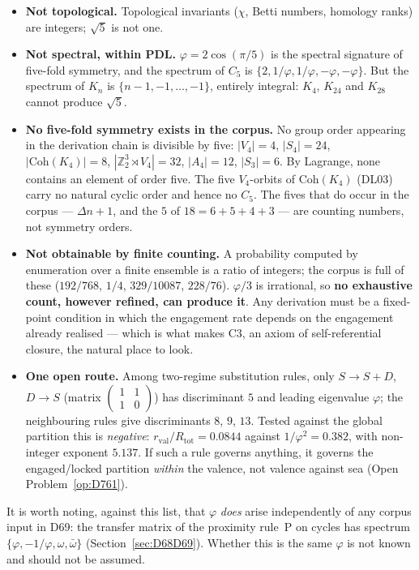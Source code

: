 \documentclass[11pt,a4paper]{article}
\theoremstyle{plain}
\theoremstyle{definition}
\theoremstyle{remark}
\newcommand{\Kfour}{K_4}
\newcommand{\rval}{r_{\mathrm{val}}}
\newcommand{\Rtot}{R_{\mathrm{tot}}}
\begin{document}
\begin{itemize}
\item \textbf{Not topological.} Topological invariants ($\chi$, Betti numbers, homology ranks) are integers; $\sqrt5$ is not one.
\item \textbf{Not spectral, within PDL.} $\varphi=2\cos(\pi/5)$ is the spectral signature of five-fold symmetry, and the spectrum of $C_5$ is $\{2,1/\varphi,1/\varphi,-\varphi,-\varphi\}$. But the spectrum of $K_n$ is $\{n-1,-1,\ldots,-1\}$, entirely integral: $\Kfour$, $K_{24}$ and $K_{28}$ cannot produce $\sqrt5$.
\item \textbf{No five-fold symmetry exists in the corpus.} No group order appearing in the derivation chain is divisible by five: $|V_4|=4$, $|S_4|=24$, $|\mathrm{Coh}(\Kfour)|=8$, $|\mathbb{Z}_2^3\rtimes V_4|=32$, $|A_4|=12$, $|S_3|=6$. By Lagrange, none contains an element of order five. The five $V_4$-orbits of $\mathrm{Coh}(\Kfour)$ (DL03) carry no natural cyclic order and hence no $C_5$. The fives that do occur in the corpus --- $\Delta n+1$, and the $5$ of $18=6+5+4+3$ --- are counting numbers, not symmetry orders.
\item \textbf{Not obtainable by finite counting.} A probability computed by enumeration over a finite ensemble is a ratio of integers; the corpus is full of these ($192/768$, $1/4$, $329/10087$, $228/76$). $\varphi/3$ is irrational, so \textbf{no exhaustive count, however refined, can produce it}. Any derivation must be a fixed-point condition in which the engagement rate depends on the engagement already realised --- which is what makes C3, an axiom of self-referential closure, the natural place to look.
\item \textbf{One open route.} Among two-regime substitution rules, only $S\to S{+}D$, $D\to S$ (matrix $\left(\begin{smallmatrix}1&1\\1&0\end{smallmatrix}\right)$) has discriminant $5$ and leading eigenvalue $\varphi$; the neighbouring rules give discriminants $8$, $9$, $13$. Tested against the global partition this is \emph{negative}: $\rval/\Rtot=0.0844$ against $1/\varphi^2=0.382$, with non-integer exponent $5.137$. If such a rule governs anything, it governs the engaged/locked partition \emph{within} the valence, not valence against sea (Open Problem~\ref{op:D761}).
\end{itemize}

\noindent It is worth noting, against this list, that $\varphi$ \emph{does} arise independently of any corpus input in D69: the transfer matrix of the proximity rule~P on cycles has spectrum $\{\varphi,-1/\varphi,\omega,\bar\omega\}$ (Section~\ref{sec:D68D69}). Whether this is the same $\varphi$ is not known and should not be assumed.
\end{document}
